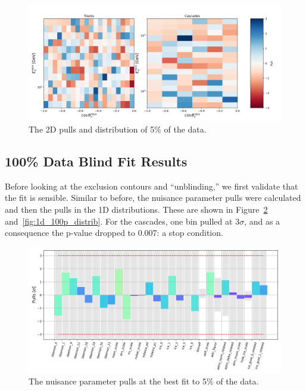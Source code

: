 \documentclass[main.tex]{subfiles}
\begin{document}
\begin{figure}
    \centering
    \includegraphics[width=0.9\linewidth]{./figures/blindfit/2dpulls_joint_data_5p_with_flavor_update_fix_IC86_data_five_percent.png}
    \caption{The 2D pulls and distribution of 5\% of the data.}\label{fig:2d_5p_distrib}
\end{figure}

\subsection{100\% Data Blind Fit Results}\label{sec:ice_chaos_ohgod}

Before looking at the exclusion contours and ``unblinding,'' we first validate that the fit is sensible. 
Similar to before, the nuisance parameter pulls were calculated and then the pulls in the 1D distributions. 
These are shown in Figure~\ref{fig:pulls_100p} and~\ref{fig:1d_100p_distrib}.
For the cascades, one bin pulled at $3\sigma$, and as a consequence the p-value dropped to 0.007: a stop condition. 

\begin{figure}
    \centering
    \includegraphics[width=0.9\linewidth]{./figures/pulls_IC86_data_full_joint_data_full.png}
    \caption{The nuisance parameter pulls at the best fit to 5\% of the data.}\label{fig:pulls_100p}
\end{figure}
\end{document}
